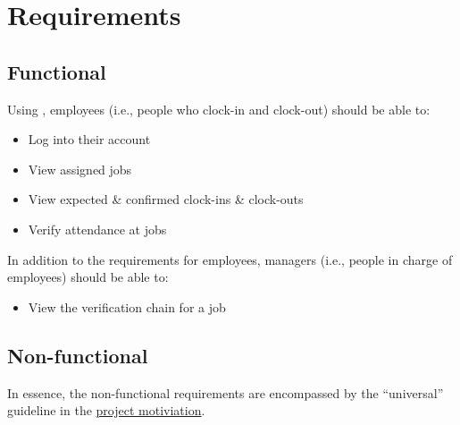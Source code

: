 \section{Requirements} \label{s:requirements}

\subsection{Functional}

Using \projectname{}, employees (i.e., people who \gls{clock-in} and
\gls{clock-out}) should be able to:

\begin{itemize}
  \item Log into their account
  \item View assigned jobs
  \item View expected \& confirmed clock-ins \&
        clock-outs
  \item Verify attendance at jobs
\end{itemize}

In addition to the requirements for employees, managers
(i.e., people in charge of employees) should be able to:

\begin{itemize}
  \item View the verification chain for a job
\end{itemize}

\subsection{Non-functional}

In essence, the non-functional requirements are encompassed
by the \enquote{universal} guideline in the
\hyperref[s:motivation]{project motiviation}.
